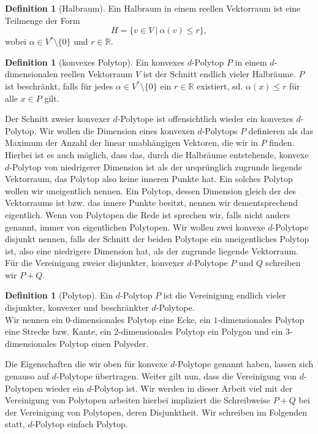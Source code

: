 \documentclass[11pt,titlepage]{article}
\newcommand{\setR}{\mathbb{R}}
\theoremstyle{definition}
\newtheorem{definition}[theorem]{Definition}
\theoremstyle{remark}
\begin{document}
	\begin{definition}[Halbraum]
		Ein Halbraum in einem reellen Vektorraum ist eine Teilmenge der Form
		\[ H= \{ v\in V \  \vert\  \alpha(v)\leq r \}, \]
		wobei $\alpha\in V^*\setminus\{0\}$ und $r\in\setR$.
	\end{definition}
	
	\begin{definition}[konvexes Polytop]
		Ein konvexes $d$-Polytop $P$ in einem $d$-dimensionalen reellen Vektorraum $V$ ist der Schnitt endlich vieler 
		Halbräume. $P$ ist beschränkt, falls für jedes $\alpha\in V^*\setminus\{0\}$ ein $r\in \setR$ existiert, sd. 
		$\alpha(x)\leq r$ für alle $x\in P$ gilt.
	\end{definition}
	
	Der Schnitt zweier konvexer $d$-Polytope ist offensichtlich wieder ein konvexes $d$-Polytop. 
	Wir wollen die Dimension eines konvexen $d$-Polytops $P$ definieren als das 
	Maximum der Anzahl der linear unabhängigen Vektoren, die wir in $P$ finden. 
	Hierbei ist es auch möglich, dass das, durch die Halbräume entstehende, 
	konvexe $d$-Polytop von niedrigerer Dimension ist als der ursprünglich 
	zugrunde liegende Vektorraum, das Polytop also keine inneren Punkte hat. 
	Ein solches Polytop wollen wir uneigentlich nennen. Ein Polytop, dessen 
	Dimension gleich der des Vektorraums ist bzw. das innere Punkte besitzt, 
	nennen wir dementsprechend eigentlich. Wenn von Polytopen die Rede ist 
	sprechen wir, falls nicht anders genannt, immer von eigentlichen Polytopen.
	Wir wollen zwei konvexe $d$-Polytope disjunkt nennen, falls der Schnitt der 
	beiden Polytope ein uneigentliches Polytop ist, also eine niedrigere 
	Dimension hat, als der zugrunde liegende Vektorraum. Für die Vereinigung 
	zweier disjunkter, konvexer $d$-Polytope $P$ und $Q$ schreiben wir $P+Q$.
	
	\begin{definition}[Polytop]
		Ein $d$-Polytop $P$ ist die Vereinigung endlich vieler disjunkter, konvexer 
		und beschränkter $d$-Polytope. \\
		Wir nennen ein $0$-dimensionales Polytop eine Ecke, ein 
		$1$-dimensionales Polytop eine Strecke bzw. Kante, ein 
		$2$-dimensionales Polytop ein Polygon und ein 
		$3$-dimensionales Polytop einen Polyeder.
	\end{definition}
	
	Die Eigenschaften die wir oben für konvexe $d$-Polytope genannt haben, 
	lassen sich genauso auf $d$-Polytope übertragen. Weiter gilt nun, dass 
	die Vereinigung von $d$-Polytopen wieder ein $d$-Polytop ist. 
	Wir werden in dieser Arbeit viel mit der Vereinigung von Polytopen arbeiten 
	hierbei impliziert die Schreibweise $P+Q$ bei der Vereinigung von Polytopen, 
	deren Disjunktheit. Wir schreiben im Folgenden statt, $d$-Polytop einfach Polytop.
	
\end{document}
